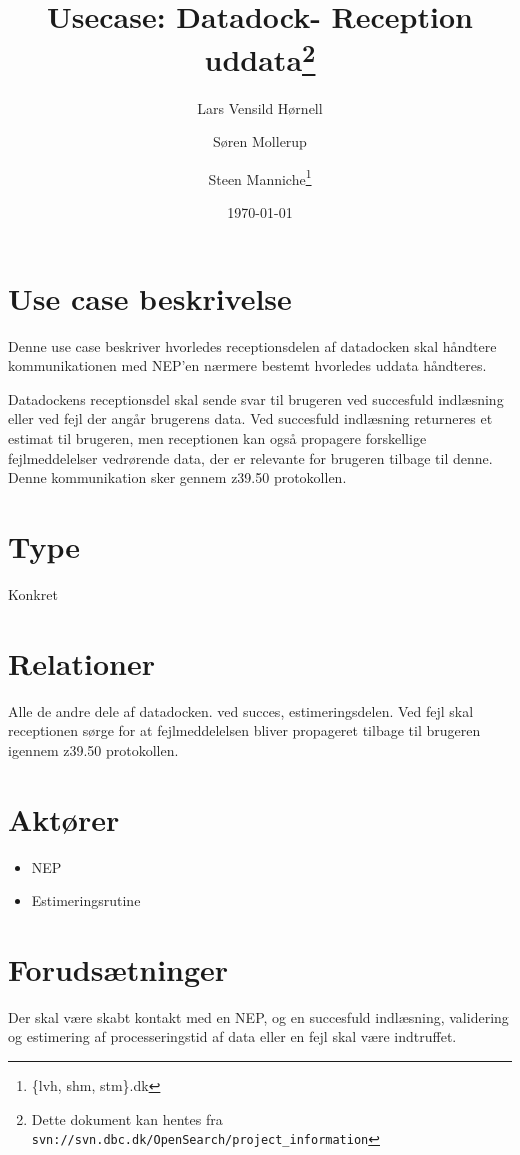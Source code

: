 \documentclass{article}
\author{Lars Vensild Hørnell \and Søren Mollerup \and Steen
  Manniche\thanks{\{lvh, shm, stm\}\@dbc.dk}}
\date{\today}
\title{Usecase: Datadock- Reception uddata\thanks{Dette dokument kan hentes fra \texttt{svn://svn.dbc.dk/OpenSearch/project\_information}}}
\begin{document}
\maketitle

\newpage

\tableofcontents

\section{Use case beskrivelse}
Denne use case beskriver hvorledes receptionsdelen af datadocken skal håndtere kommunikationen med NEP'en nærmere bestemt hvorledes uddata håndteres.

Datadockens receptionsdel skal sende svar til brugeren ved succesfuld indlæsning eller ved fejl der angår brugerens data. Ved succesfuld indlæsning returneres et estimat til brugeren, men receptionen kan også propagere forskellige fejlmeddelelser vedrørende data, der er relevante for brugeren tilbage til denne. Denne kommunikation sker gennem z39.50 protokollen.  

\section{Type}
Konkret

\section{Relationer}
Alle de andre dele af
datadocken. ved succes, estimeringsdelen. Ved fejl skal receptionen
sørge for at fejlmeddelelsen bliver propageret tilbage til brugeren
igennem z39.50 protokollen.

\section{Aktører}
\begin{itemize}
\item NEP
\item Estimeringsrutine
\end{itemize}

\section{Forudsætninger}
Der skal være skabt kontakt med en NEP, og en succesfuld indlæsning,
validering og estimering af processeringstid af data eller en fejl skal være indtruffet.
\end{document}
